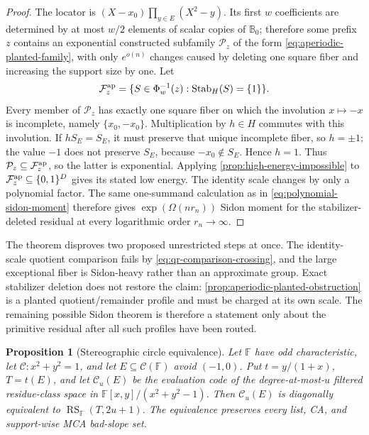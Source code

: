\documentclass[12pt,a4paper]{amsart}
\numberwithin{equation}{section}
\newtheorem{proposition}[proposition]{Proposition}
\theoremstyle{remark}
\DeclareMathOperator{\RS}{RS}
\newcommand{\F}{\mathbb F}
\newcommand{\B}{\mathbb B}
\newcommand{\Fcal}{\mathcal F}
\newcommand{\Pcal}{\mathcal P}
\begin{document}
\begin{proof}
The locator is
\((X-x_0)\prod_{y\in E}(X^2-y)\).  Its first \(w\) coefficients are
determined by at most \(w/2\) elements of scalar copies of \(\B_0\);
therefore some prefix \(z\) contains an exponential constructed subfamily
\(\Pcal_z\) of the form \eqref{eq:aperiodic-planted-family}, with only
\(e^{o(n)}\) changes caused by deleting one square fiber and increasing
the support size by one.  Let
\[
 \Fcal_z^{\rm ap}=\{S\in\Phi_w^{-1}(z):
                    \operatorname{Stab}_H(S)=\{1\}\}.
\]
Every member of \(\Pcal_z\) has exactly one square fiber on which the involution
\(x\mapsto-x\) is incomplete, namely \(\{x_0,-x_0\}\).  Multiplication by
\(h\in H\) commutes with this involution.  If \(hS_E=S_E\), it must
preserve that unique incomplete fiber, so \(h=\pm1\); the value \(-1\)
does not preserve \(S_E\), because \(-x_0\notin S_E\).  Hence \(h=1\).
Thus \(\Pcal_z\subseteq\Fcal_z^{\rm ap}\), so the latter is exponential.
Applying \cref{prop:high-energy-impossible} to
\(\Fcal_z^{\rm ap}\subseteq\{0,1\}^D\) gives its stated low energy.
The identity scale changes by only a polynomial factor.
The same one-summand calculation as in
\eqref{eq:polynomial-sidon-moment} therefore gives
\(\exp(\Omega(nr_n))\) Sidon moment for the stabilizer-deleted residual
at every logarithmic order \(r_n\to\infty\).
\end{proof}

The theorem disproves two proposed unrestricted steps at once.  The
identity-scale quotient comparison fails by
\eqref{eq:qr-comparison-crossing}, and the large exceptional fiber is
Sidon-heavy rather than an approximate group.  Exact stabilizer deletion
does not restore the claim: \cref{prop:aperiodic-planted-obstruction} is a
planted quotient/remainder profile and must be charged at its own scale.
The remaining possible Sidon theorem is therefore a statement only about
the primitive residual after all such profiles have been routed.

\begin{proposition}[Stereographic circle equivalence]
\label{prop:stereographic-circle-equivalence}
Let \(\F\) have odd characteristic, let
\(\mathcal C:x^2+y^2=1\), and let \(E\subseteq\mathcal C(\F)\) avoid
\((-1,0)\).  Put \(t=y/(1+x)\), \(T=t(E)\), and let
\(\mathcal C_u(E)\) be the evaluation code of the degree-at-most-\(u\)
filtered residue-class space in
\(\F[x,y]/(x^2+y^2-1)\).  Then \(\mathcal C_u(E)\) is diagonally
equivalent to \(\RS_\F(T,2u+1)\).  The equivalence preserves every list,
CA, and support-wise MCA bad-slope set.
\end{proposition}
\end{document}
